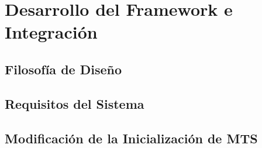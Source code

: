 \chapter{Desarrollo del Framework e Integración}

\section{Filosofía de Diseño}

\section{Requisitos del Sistema}

\section{Modificación de la Inicialización de MTS}

